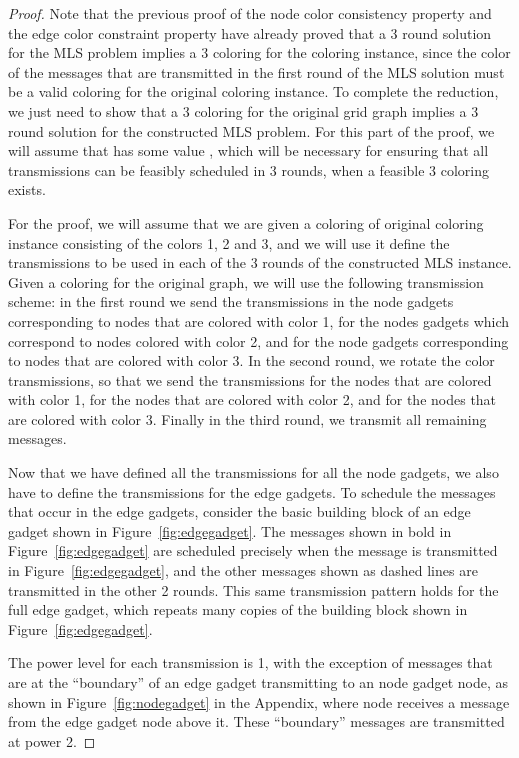 \documentclass{article}
\begin{document}
\begin{proof}
Note that the previous proof of the node color consistency property and the edge color constraint property have already proved that a 3 round solution for the MLS problem implies a 3 coloring for the coloring instance, since the color of the messages that are transmitted in the first round of the MLS solution must be a valid coloring for the original coloring instance.  To complete the reduction, we just need to show that a 3 coloring for the original grid graph implies a 3 round solution for the constructed MLS problem.  For this part of the proof, we will assume that  has some value , which will be necessary for ensuring that all transmissions can be feasibly scheduled in 3 rounds, when a feasible 3 coloring exists.

For the proof, we will assume that we are given a coloring of original coloring instance consisting of the colors 1, 2 and 3, and we will use it define the transmissions to be used in each of the 3 rounds of the constructed MLS instance.  Given a coloring for the original graph, we will use the following transmission scheme: in the first round we send the  transmissions in the node gadgets corresponding to nodes  that are colored with color 1,  for the nodes gadgets which correspond to nodes  colored with color 2, and  for the node gadgets corresponding to nodes  that are colored with color 3.  In the second round, we rotate the color transmissions, so that we send the  transmissions for the nodes  that are colored with color 1,  for the nodes  that are colored with color 2, and  for the nodes  that are colored with color 3.  Finally in the third round, we transmit all remaining messages.

Now that we have defined all the transmissions for all the node gadgets, we also have to define the transmissions for the edge gadgets.  To schedule the messages that occur in the edge gadgets, consider the basic building block of an edge gadget shown in Figure~\ref{fig:edgegadget}.  The messages shown in bold in Figure~\ref{fig:edgegadget} are scheduled precisely when the message  is transmitted in Figure~\ref{fig:edgegadget}, and the other messages shown as dashed lines are transmitted in the other 2 rounds.  This same transmission pattern holds for the full edge gadget, which repeats many copies of the building block shown in Figure~\ref{fig:edgegadget}.

The power level for each transmission is 1, with the exception of messages that are at the ``boundary'' of an edge gadget transmitting to an node gadget node, as shown in Figure~\ref{fig:nodegadget} in the Appendix, where node  receives a message from the edge gadget node above it.  These ``boundary'' messages are transmitted at power 2.


\end{proof}
\end{document}
